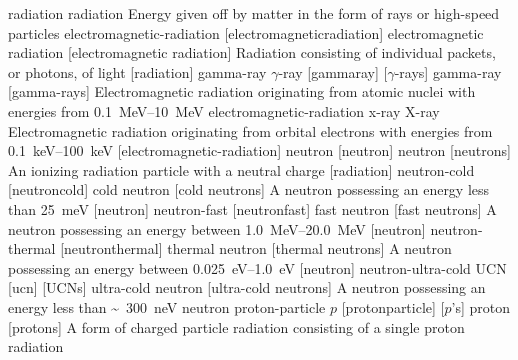 \newglsXterm%
{radiation}%
{radiation}%
{Energy given off by matter in the form of rays or high{\--}speed particles}%
\newglsXterm%
{electromagnetic-radiation}%
[electromagneticradiation]%
{electromagnetic radiation}%
[electromagnetic radiation]%
{Radiation consisting of individual packets, or photons, of light}%
[radiation]%
\newglsXacronym%
{gamma-ray}%
{{}$\gamma${\--}ray}%
[gammaray]%
[{}$\gamma${\--}rays]%
{gamma{\--}ray}%
[gamma{\--}rays]%
{Electromagnetic radiation originating from atomic nuclei with energies from \SIrange{0.1}{10}{\mega\electronvolt}}%
{electromagnetic-radiation}%
\newglsXterm%
{x-ray}%
{X{\--}ray}%
{Electromagnetic radiation originating from orbital electrons with energies from \SIrange{0.1}{100}{\kilo\electronvolt}}%
[electromagnetic-radiation]%
\newglsXterm%
{neutron}%
[neutron]%
{neutron}%
[neutrons]%
{An ionizing radiation particle with a neutral charge}%
[radiation]%
\newglsXterm%
{neutron-cold}%
[neutroncold]%
{cold neutron}%
[cold neutrons]%
{A neutron possessing an energy less than \SI{25}{\milli\electronvolt}}%
[neutron]%
\newglsXterm%
{neutron-fast}%
[neutronfast]%
{fast neutron}%
[fast neutrons]%
{A neutron possessing an energy between \SIrange{1.0}{20.0}{\mega\electronvolt}}%
[neutron]%
\newglsXterm%
{neutron-thermal}%
[neutronthermal]%
{thermal neutron}%
[thermal neutrons]%
{A neutron possessing an energy between \SIrange{0.025}{1.0}{\electronvolt}}%
[neutron]%
\newglsXacronym%
{neutron-ultra-cold}%
{UCN}%
[ucn]%
[UCNs]%
{ultra{\--}cold neutron}%
[ultra{\--}cold neutrons]%
{A neutron possessing an energy less than \SI{300}[\sim]{\nano\electronvolt}}%
{neutron}%
\newglsXacronym%
{proton-particle}%
{{}$p$}%
[protonparticle]%
[{}$p$'s]%
{proton}%
[protons]%
{A form of charged particle radiation consisting of a single proton}%
{radiation}%
